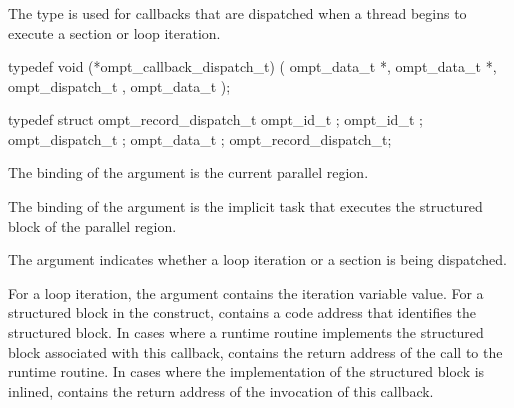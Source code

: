\subsubsection{}
\label{sec:ompt_callback_dispatch_t}

\summary
The  type is used for callbacks that are
dispatched when a thread begins to execute a section or loop iteration.

\format
\begin{ccppspecific}
\begin{omptCallback}
typedef void (*ompt_callback_dispatch_t) (
  ompt_data_t *,
  ompt_data_t *,
  ompt_dispatch_t ,
  ompt_data_t  
);
\end{omptCallback}
\end{ccppspecific}

\record
\begin{ccppspecific}
\begin{omptRecord}
typedef struct ompt_record_dispatch_t {
  ompt_id_t ;
  ompt_id_t ;
  ompt_dispatch_t ;
  ompt_data_t ; 
} ompt_record_dispatch_t;
\end{omptRecord}
\end{ccppspecific}

\argdesc
The binding of the  argument is the current parallel region.

The binding of the  argument is the implicit task that executes
the structured block of the parallel region.

The  argument indicates whether a loop iteration or a section is being 
dispatched.

For a loop iteration, the  argument contains the iteration 
variable value. For a structured block in the  construct, 
 contains a code address that identifies the structured block.  
In cases where a runtime routine implements the structured block associated with 
this callback,  contains the return address of the call to the 
runtime routine. In cases where the implementation of the structured block is 
inlined,  contains the return address of the invocation of 
this callback.

